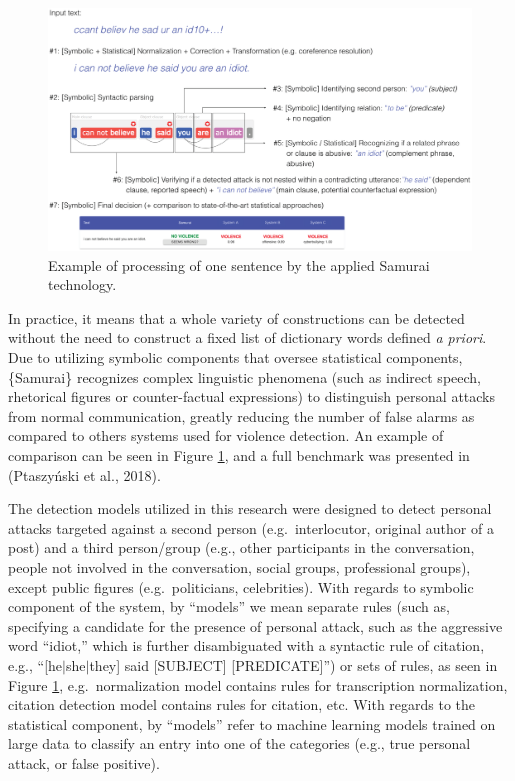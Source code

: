 \documentclass[10pt,dvipsnames]{scrartcl}
\begin{document}
\begin{figure}[h]
    \centering
    \includegraphics[width=\linewidth]{../images/example.eps}
    \caption{Example of processing of one sentence by the applied Samurai technology.}
    \label{fig:samuraiexample}
\end{figure}

In practice, it means that a whole variety of constructions can be
detected without the need to construct a fixed list of dictionary words
defined \textit{a priori}. Due to utilizing symbolic components that
oversee statistical components, \{\textsf Samurai\} recognizes complex
linguistic phenomena (such as indirect speech, rhetorical figures or
counter-factual expressions) to distinguish personal attacks from normal
communication, greatly reducing the number of false alarms as compared
to others systems used for violence detection. An example of comparison
can be seen in Figure \ref{fig:samuraiexample}, and a full benchmark was
presented in (Ptaszyński et al., 2018).

The detection models utilized in this research were designed to detect
personal attacks targeted against a second person (e.g.~interlocutor,
original author of a post) and a third person/group (e.g., other
participants in the conversation, people not involved in the
conversation, social groups, professional groups), except public figures
(e.g.~politicians, celebrities). With regards to symbolic component of
the system, by ``models'' we mean separate rules (such as, specifying a
candidate for the presence of personal attack, such as the aggressive
word ``idiot,'' which is further disambiguated with a syntactic rule of
citation, e.g., ``{[}he\(\vert\)she\(\vert\)they{]} said {[}SUBJECT{]}
{[}PREDICATE{]}'') or sets of rules, as seen in Figure
\ref{fig:samuraiexample}, e.g.~normalization model contains rules for
transcription normalization, citation detection model contains rules for
citation, etc. With regards to the statistical component, by ``models''
refer to machine learning models trained on large data to classify an
entry into one of the categories (e.g., true personal attack, or false
positive).
\end{document}
